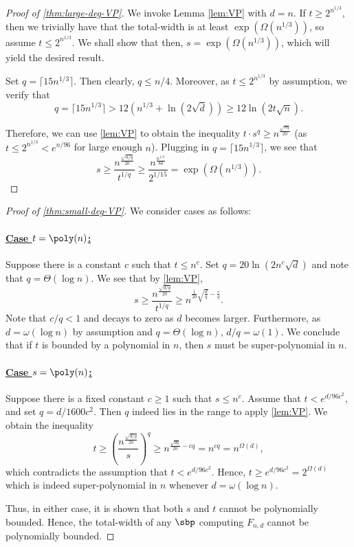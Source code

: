 \documentclass{article}
\begin{document}
\begin{proof}[Proof of \autoref{thm:large-deg-VP}]
We invoke Lemma \ref{lem:VP} with $d = n$. If $t \geq 2^{n^{1/3}}$, then we trivially have that the total-width is at least  ${\exp(\Omega(n^{1/3}))}$, so assume $t \leq 2^{n^{1/3}}$. We shall show that then, $s = \exp(\Omega(n^{1/3}))$, which will yield the desired result.

Set $q = \lceil 15n^{1/3}\rceil$. Then clearly, $q\leq n/4$. Moreover, as $t \leq 2^{n^{1/3}}$ by assumption, we verify that 
\[
q = \lceil 15n^{1/3} \rceil> 12 (n^{1/3} + \ln(2\sqrt{d})) \geq 12\ln(2t\sqrt{n}).
\]

Therefore, we can use \autoref{lem:VP} to obtain the inequality $t\cdot s^q \geq n^{\frac{\sqrt{nq}}{20}}$ (as $t\leq 2^{n^{1/3}}< e^{n/96}$ for large enough $n$). Plugging in $q = \lceil 15n^{1/3} \rceil$, we see that 
\[
s \geq \frac{n^{\frac{\sqrt{n/q}}{20}}}{t^{1/q}} \geq \frac{n^{\frac{n^{1/3}}{80}}}{2^{1/15}} = \exp(\Omega(n^{1/3})).
\]
\end{proof}

\begin{proof}[Proof of \autoref{thm:small-deg-VP}]
We consider cases as follows:

\paragraph{\underline{Case $t = \poly(n)$:}} Suppose there is a constant $c$ such that $t\leq n^c$. Set $q = 20 \ln (2n^c\sqrt{d})$ and note that $q = \Theta(\log n)$. We see that by \autoref{lem:VP},
\[
s \geq \frac{n^{\frac{\sqrt{d/q}}{20}}}{t^{1/q}} \geq n^{\frac{1}{20}\sqrt{\frac{d}{q}} - \frac{c}{q}}.
\]
Note that $c/q <1$ and decays to zero as $d$ becomes larger. Furthermore, as $d = \omega(\log n)$ by assumption and $q = \Theta(\log n)$, $d/q = \omega(1)$. We conclude that if $t$ is bounded by a polynomial in $n$, then $s$ must be super-polynomial in $n$.

\paragraph{\underline{Case $s = \poly(n)$:}} Suppose there is a fixed constant $c\geq 1$ such that $s\leq n^c$. Assume that $t<e^{d/96c^2}$, and set $q = d/1600c^2$. Then $q$ indeed lies in the range to apply \autoref{lem:VP}. We obtain the inequality
\[
t\geq \left(\frac{n^{\frac{\sqrt{d/q}}{20}}}{s}\right)^q \geq n^{\frac{\sqrt{dq}}{20} - cq} = n^{cq} = n^{\Omega(d)},
\]
which contradicts the assumption that $t<e^{d/96c^2}$. Hence, $t \geq e^{d/96c^2} = 2^{\Omega(d)}$ which is indeed super-polynomial in $n$ whenever $d = \omega(\log n)$.

Thus, in either case, it is shown that both $s$ and $t$ cannot be polynomially bounded. Hence, the total-width of any $\sbp$ computing $F_{n,d}$ cannot be polynomially bounded.
\end{proof}
\end{document}
